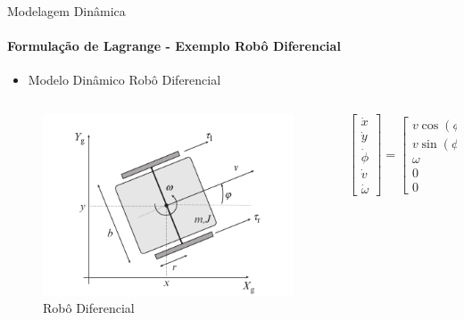 \documentclass[aspectratio=169]{beamer}
\begin{document}
\begin{frame}{Modelagem Dinâmica}
    \framesubtitle{Formulação de Lagrange - Exemplo Robô Diferencial}

    \begin{itemize}
        \item Modelo Dinâmico Robô Diferencial
    \end{itemize}

    \begin{columns}
        \begin{column}[c]{0.4\textwidth}
            \begin{figure}
                \centering
                \includegraphics[width=1\textwidth]{./images/dynamic_diff_car.png}
                \caption{Robô Diferencial}
            \end{figure}
        \end{column}
        \begin{column}[c]{0.6\textwidth}
            \begin{equation*}
                \begin{bmatrix}
                    \dot{x} \\ \dot{y} \\ \dot{\phi} \\ \dot{v} \\ \dot{\omega}
                \end{bmatrix}=
                \begin{bmatrix}
                    v \cos(\phi) \\ v \sin(\phi) \\ \omega \\ 0 \\ 0

\end{bmatrix}
\end{equation*}
\end{column}
\end{columns}
\end{frame}
\end{document}
